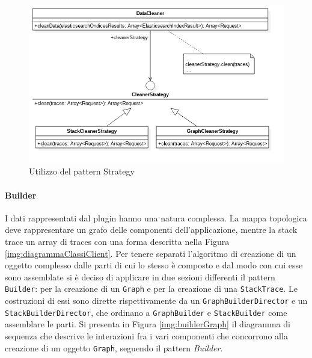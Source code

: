 \begin{figure}[h]
	\centering
	\includegraphics[width=1\textwidth]{Images/patternStrategy.png}
	\caption{Utilizzo del pattern Strategy}
	\label{img:strategy}
\end{figure}
 
\paragraph{Builder} \Spazio
\label{sec:patternBuilder}
I dati rappresentati dal plugin hanno una natura complessa. La mappa topologica deve rappresentare un grafo delle componenti dell'applicazione, mentre la stack trace un array di traces con una forma descritta nella Figura \ref{img:diagrammaClassiClient}. Per tenere separati l'algoritmo di creazione di un oggetto complesso dalle parti di cui lo stesso è composto e dal modo con cui esse sono assemblate si è deciso di applicare in due sezioni differenti il pattern \texttt{Builder}: per la creazione di un \texttt{Graph} e per la creazione di una \texttt{StackTrace}. Le costruzioni di essi sono dirette rispettivamente da un \texttt{GraphBuilderDirector} e un \texttt{StackBuilderDirector}, che ordinano a \texttt{GraphBuilder} e \texttt{StackBuilder} come assemblare le parti. 
Si presenta in Figura \ref{img:builderGraph} il diagramma di sequenza che descrive le interazioni fra i vari componenti che concorrono alla creazione di un oggetto \texttt{Graph}, seguendo il pattern \emph{Builder}.


